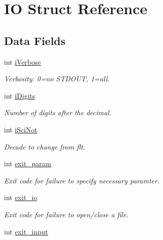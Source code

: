 \hypertarget{struct_i_o}{}\section{I\+O Struct Reference}
\label{struct_i_o}
\subsection*{Data Fields}
\begin{DoxyCompactItemize}
\item 
\hypertarget{struct_i_o_a82125fb899e0dcbbc91f732286268443}{}int \hyperlink{struct_i_o_a82125fb899e0dcbbc91f732286268443}{i\+Verbose}\label{struct_i_o_a82125fb899e0dcbbc91f732286268443}

\begin{DoxyCompactList}\small\item\em Verbosity\+: 0=no S\+T\+D\+O\+U\+T, 1=all. \end{DoxyCompactList}\item 
int \hyperlink{struct_i_o_a69a5be3fbf5bb997287c9a00a324bc5c}{i\+Digits}
\begin{DoxyCompactList}\small\item\em Number of digits after the decimal. \end{DoxyCompactList}\item 
int \hyperlink{struct_i_o_a703b6e2abf0338ef9723604bc88af810}{i\+Sci\+Not}
\begin{DoxyCompactList}\small\item\em Decade to change from flt. \end{DoxyCompactList}\item 
\hypertarget{struct_i_o_a50a92dbf069995a53a7f57027602d712}{}int \hyperlink{struct_i_o_a50a92dbf069995a53a7f57027602d712}{exit\+\_\+param}\label{struct_i_o_a50a92dbf069995a53a7f57027602d712}

\begin{DoxyCompactList}\small\item\em Exit code for failure to specify necessary paramter. \end{DoxyCompactList}\item 
\hypertarget{struct_i_o_a0bbb4bdcc44cdc5faa26d70a61939be6}{}int \hyperlink{struct_i_o_a0bbb4bdcc44cdc5faa26d70a61939be6}{exit\+\_\+io}\label{struct_i_o_a0bbb4bdcc44cdc5faa26d70a61939be6}

\begin{DoxyCompactList}\small\item\em Exit code for failure to open/close a file. \end{DoxyCompactList}\item 
\hypertarget{struct_i_o_affa26bcb764a9a997ed8b1366a10717a}{}int \hyperlink{struct_i_o_affa26bcb764a9a997ed8b1366a10717a}{exit\+\_\+input}\label{struct_i_o_affa26bcb764a9a997ed8b1366a10717a}


\end{DoxyCompactItemize}
